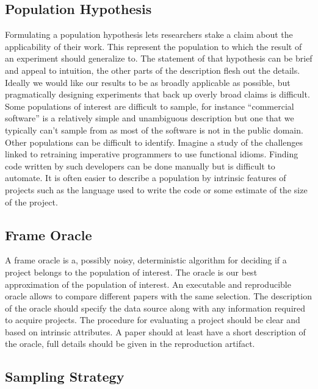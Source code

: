 \documentclass[sigconf,review,anonymous]{acmart}
\begin{document}
\subsection{Population Hypothesis}

Formulating a population hypothesis lets researchers stake a claim about the
applicability of their work. This represent the population to which the result
of an experiment should generalize to. The statement of that hypothesis can be
brief and appeal to intuition, the other parts of the description flesh out
the details.
%
Ideally we would like our results to be as broadly applicable as possible, but
pragmatically designing experiments that back up overly broad claims is
difficult. Some populations of interest are difficult to sample, for instance
``commercial software'' is a relatively simple and unambiguous description but
one that we typically can't sample from as most of the software is not in the
public domain. Other populations can be difficult to identify. Imagine a study
of the challenges linked to retraining imperative programmers to use functional
idioms. Finding code written by such developers can be done manually but is
difficult to automate. It is often easier to describe a population by intrinsic
features of projects such as the language used to write the code or some
estimate of the size of the project.

\subsection{Frame Oracle}

A frame oracle is a, possibly noisy, deterministic algorithm for deciding if a
project belongs to the population of interest. The oracle is our best
approximation of the population of interest. An executable and reproducible
oracle allows to compare different papers with the same selection. The
description of the oracle should specify the data source along with any
information required to acquire projects. The procedure for evaluating a project
should be clear and based on intrinsic attributes. A paper should at least have
a short description of the oracle, full details should be given in the
reproduction artifact.

\subsection{Sampling Strategy}
\end{document}
